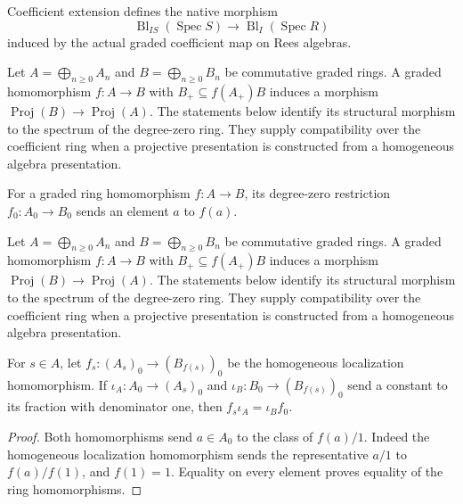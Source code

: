 \endgroup

\begingroup

\begin{definition}
\label{def:affine-blowup-coefficient-map}
\leanok
Coefficient extension defines the native morphism
\[\operatorname{Bl}_{IS}(\operatorname{Spec}S)
  \longrightarrow\operatorname{Bl}_I(\operatorname{Spec}R)\]
induced by the actual graded coefficient map on Rees algebras.
\end{definition}

\endgroup

\begingroup

Let $A=\bigoplus_{n\geq0}A_n$ and $B=\bigoplus_{n\geq0}B_n$ be
commutative graded rings. A graded homomorphism $f:A\to B$ with
$B_+\subseteq f(A_+)B$ induces a morphism
$\operatorname{Proj}(B)\to\operatorname{Proj}(A)$. The statements below
identify its structural morphism to the spectrum of the degree-zero ring.
They supply compatibility over the coefficient ring when a projective
presentation is constructed from a homogeneous algebra presentation.

\begin{definition}
\label{def:proj-degree-zero-map}
\leanok
For a graded ring homomorphism $f:A\to B$, its degree-zero restriction
$f_0:A_0\to B_0$ sends an element $a$ to $f(a)$.
\end{definition}

\endgroup

\begingroup

Let $A=\bigoplus_{n\geq0}A_n$ and $B=\bigoplus_{n\geq0}B_n$ be
commutative graded rings. A graded homomorphism $f:A\to B$ with
$B_+\subseteq f(A_+)B$ induces a morphism
$\operatorname{Proj}(B)\to\operatorname{Proj}(A)$. The statements below
identify its structural morphism to the spectrum of the degree-zero ring.
They supply compatibility over the coefficient ring when a projective
presentation is constructed from a homogeneous algebra presentation.

\begin{lemma}
\label{lem:proj-localization-degree-zero}
\leanok
For $s\in A$, let $f_s:(A_s)_0\to(B_{f(s)})_0$ be the homogeneous
localization homomorphism. If $\iota_A:A_0\to(A_s)_0$ and
$\iota_B:B_0\to(B_{f(s)})_0$ send a constant to its fraction with
denominator one, then $f_s\iota_A=\iota_B f_0$.
\end{lemma}
\begin{proof}
Both homomorphisms send $a\in A_0$ to the class of $f(a)/1$. Indeed the
homogeneous localization homomorphism sends the representative $a/1$ to
$f(a)/f(1)$, and $f(1)=1$. Equality on every element proves equality of
the ring homomorphisms.
\end{proof}

